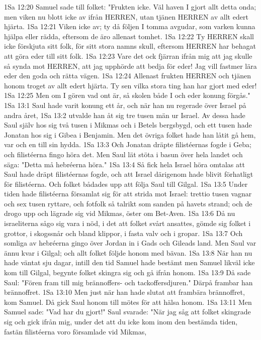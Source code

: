 1Sa 12:20  Samuel sade till folket: "Frukten icke. Väl haven I gjort allt detta onda; men viken nu blott icke av ifrån HERREN, utan tjänen HERREN av allt edert hjärta.
1Sa 12:21  Viken icke av; ty då följen I tomma avgudar, som varken kunna hjälpa eller rädda, eftersom de äro allenast tomhet.
1Sa 12:22  Ty HERREN skall icke förskjuta sitt folk, för sitt stora namns skull, eftersom HERREN har behagat att göra eder till sitt folk.
1Sa 12:23  Vare det ock fjärran ifrån mig att jag skulle så synda mot HERREN, att jag upphörde att bedja för eder! Jag vill fastmer lära eder den goda och rätta vägen.
1Sa 12:24  Allenast frukten HERREN och tjänen honom troget av allt edert hjärta. Ty sen vilka stora ting han har gjort med eder!
1Sa 12:25  Men om I gören vad ont är, så skolen både I och eder konung förgås."
1Sa 13:1  Saul hade varit konung ett år, och när han nu regerade över Israel på andra året,
1Sa 13:2  utvalde han åt sig tre tusen män ur Israel. Av dessa hade Saul själv hos sig två tusen i Mikmas och i Betels bergsbygd, och ett tusen hade Jonatan hos sig i Gibea i Benjamin. Men det övriga folket hade han låtit gå hem, var och en till sin hydda.
1Sa 13:3  Och Jonatan dräpte filistéernas fogde i Geba; och filistéerna fingo höra det. Men Saul lät stöta i basun över hela landet och säga: "Detta må hebréerna höra."
1Sa 13:4  Så fick hela Israel höra omtalas att Saul hade dräpt filistéernas fogde, och att Israel därigenom hade blivit förhatligt för filistéerna. Och folket bådades upp att följa Saul till Gilgal.
1Sa 13:5  Under tiden hade filistéerna församlat sig för att strida mot Israel: trettio tusen vagnar och sex tusen ryttare, och fotfolk så talrikt som sanden på havets strand; och de drogo upp och lägrade sig vid Mikmas, öster om Bet-Aven.
1Sa 13:6  Då nu israeliterna sågo sig vara i nöd, i det att folket svårt ansattes, gömde sig folket i grottor, i skogssnår och bland klippor, i fasta valv och i gropar.
1Sa 13:7  Och somliga av hebréerna gingo över Jordan in i Gads och Gileads land. Men Saul var ännu kvar i Gilgal; och allt folket följde honom med bävan.
1Sa 13:8  När han nu hade väntat sju dagar, intill den tid Samuel hade bestämt men Samuel likväl icke kom till Gilgal, begynte folket skingra sig och gå ifrån honom.
1Sa 13:9  Då sade Saul: "Fören fram till mig brännoffers- och tackoffersdjuren." Därpå frambar han brännoffret.
1Sa 13:10  Men just när han hade slutat att frambära brännoffret, kom Samuel. Då gick Saul honom till mötes för att hälsa honom.
1Sa 13:11  Men Samuel sade: "Vad har du gjort!" Saul svarade: "När jag såg att folket skingrade sig och gick ifrån mig, under det att du icke kom inom den bestämda tiden, fastän filistéerna voro församlade vid Mikmas,

